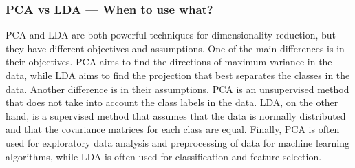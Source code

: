         \subsubsection{PCA vs LDA — When to use what?}
            PCA and LDA are both powerful techniques for dimensionality reduction, but they have different objectives and assumptions.
            One of the main differences is in their objectives. PCA aims to find the directions of maximum variance in the data, while LDA aims to find the projection that best separates the classes in the data.
            Another difference is in their assumptions. PCA is an unsupervised method that does not take into account the class labels in the data. LDA, on the other hand, is a supervised method that assumes that the data is normally distributed and that the covariance matrices for each class are equal.
            Finally, PCA is often used for exploratory data analysis and preprocessing of data for machine learning algorithms, while LDA is often used for classification and feature selection.
